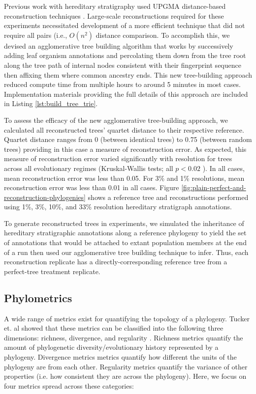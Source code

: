 Previous work with hereditary stratigraphy used UPGMA distance-based reconstruction techniques \citep{moreno2022hereditary}.
Large-scale reconstructions required for these experiments necessitated development of a more efficient technique that did not require all pairs (i.e., $O(n^2)$ distance comparison.
To accomplish this, we devised an agglomerative tree building algorithm that works by successively adding leaf organism annotations and percolating them down from the tree root along the tree path of internal nodes consistent with their fingerprint sequence then affixing them where common ancestry ends.
This new tree-building approach reduced compute time from multiple hours to around 5 minutes in most cases. 
Implementation materials providing the full details of this approach are included in Listing \ref{lst:build_tree_trie}.



To assess the efficacy of the new agglomerative tree-building approach, we calculated all reconstructed trees' quartet distance to  their respective reference.
Quartet distance ranges from 0 (between identical trees) to 0.75 (between random trees)
providing in this case a measure of reconstruction error.
As expected, this measure of reconstruction error varied significantly with resolution for trees across all evolutionary regimes (Kruskal-Wallis tests; all $p < 0.02$ ).
In all cases, mean reconstruction error was less than 0.05.
For 3\% and 1\% resolutions, mean reconstruction error was less than 0.01 in all cases.
Figure \ref{fig:plain-perfect-and-reconstruction-phylogenies} shows a reference tree and reconstructions performed using 1\%, 3\%, 10\%, and 33\% resolution hereditary stratigraph annotations.

To generate reconstructed trees in experiments, we simulated the inheritance of hereditary stratigraphic annotations along a reference phylogeny to yield the set of annotations that would be attached to extant population members at the end of a run then used our agglomerative tree building technique to infer. 
Thus, each reconstruction replicate has a directly-corresponding reference tree from a perfect-tree treatment replicate.

\subsection{Phylometrics}

A wide range of metrics exist for quantifying the topology of a phylogeny. Tucker et. al showed that these metrics can be classified into the following three dimensions: richness, divergence, and regularity \citep{tuckerGuidePhylogeneticMetrics2017}. 
Richness metrics quantify the amount of phylogenetic diversity/evolutionary history represented by a phylogeny. 
Divergence metrics metrics quantify how different the units of the phylogeny are from each other. 
Regularity metrics quantify the variance of other properties (i.e. how consistent they are across the phylogeny). 
Here, we focus on four metrics spread across these categories:

